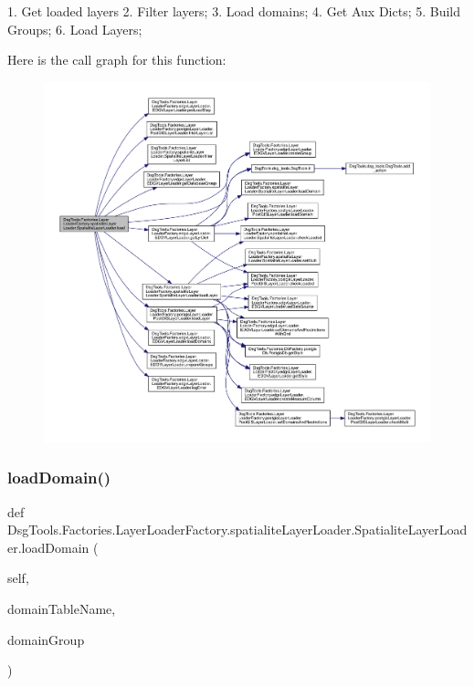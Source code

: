 \begin{DoxyVerb}1. Get loaded layers
2. Filter layers;
3. Load domains;
4. Get Aux Dicts;
5. Build Groups;
6. Load Layers;
\end{DoxyVerb}
 Here is the call graph for this function\+:
\nopagebreak
\begin{figure}[H]
\begin{center}
\leavevmode
\includegraphics[width=350pt]{class_dsg_tools_1_1_factories_1_1_layer_loader_factory_1_1spatialite_layer_loader_1_1_spatialite_layer_loader_a17fcbc72caf568e12a88b1b4c1449038_cgraph}
\end{center}
\end{figure}
\mbox{\label{class_dsg_tools_1_1_factories_1_1_layer_loader_factory_1_1spatialite_layer_loader_1_1_spatialite_layer_loader_a8ad35427b9daaa2a7a44e3e8fd7fdd73}} 
\subsubsection{\texorpdfstring{load\+Domain()}{loadDomain()}}
{\footnotesize\ttfamily def Dsg\+Tools.\+Factories.\+Layer\+Loader\+Factory.\+spatialite\+Layer\+Loader.\+Spatialite\+Layer\+Loader.\+load\+Domain (\begin{DoxyParamCaption}\item[{}]{self,  }\item[{}]{domain\+Table\+Name,  }\item[{}]{domain\+Group }\end{DoxyParamCaption})}

